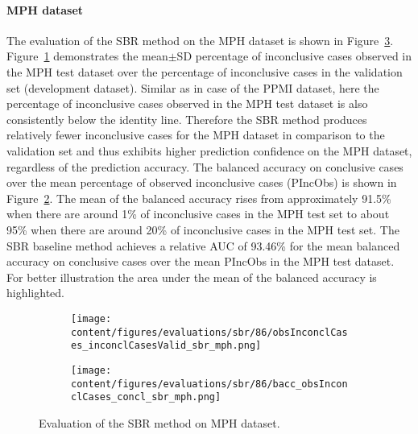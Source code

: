
\paragraph{MPH dataset}

The evaluation of the SBR method on the MPH dataset is shown in Figure~\ref{fig:perf_results_sbr_mph}.
Figure~\ref{fig:obsInconclCases_inconclCasesValid_sbr_mph} demonstrates 
the mean$\pm$SD percentage of inconclusive cases observed in the MPH test dataset 
over the percentage of inconclusive cases in the validation set (development dataset).
Similar as in case of the PPMI dataset, here the percentage of inconclusive cases observed in the MPH test dataset
is also consistently below the identity line.
Therefore the SBR method produces relatively fewer inconclusive cases for the MPH dataset  
in comparison to the validation set and thus exhibits higher prediction confidence on the MPH dataset, 
regardless of the prediction accuracy.
The balanced accuracy on conclusive cases over the mean percentage of observed inconclusive cases (PIncObs) is shown 
in Figure~\ref{fig:bacc_obsInconclCases_concl_sbr_mph}.
The mean of the balanced accuracy rises from approximately 91.5\% 
when there are around 1\% of inconclusive cases in the MPH test set to about 95\% 
when there are around 20\% of inconclusive cases in the MPH test set.
The SBR baseline method achieves a relative AUC of 93.46\% for the mean balanced accuracy on conclusive cases 
over the mean PIncObs in the MPH test dataset.
For better illustration the area under the mean of the balanced accuracy is highlighted.


\begin{figure}[ht]
  \begin{subfigure}{0.9\textwidth}
    \centering
    \texttt{[image: content/figures/evaluations/sbr/86/obsInconclCases\_inconclCasesValid\_sbr\_mph.png]}
    \label{fig:obsInconclCases_inconclCasesValid_sbr_mph}
  \end{subfigure}
  \hfill
  \begin{subfigure}{0.9\textwidth}
    \centering
    \texttt{[image: content/figures/evaluations/sbr/86/bacc\_obsInconclCases\_concl\_sbr\_mph.png]}
    \label{fig:bacc_obsInconclCases_concl_sbr_mph}
  \end{subfigure}
  \caption{Evaluation of the SBR method on MPH dataset.}
  \label{fig:perf_results_sbr_mph}
\end{figure}

